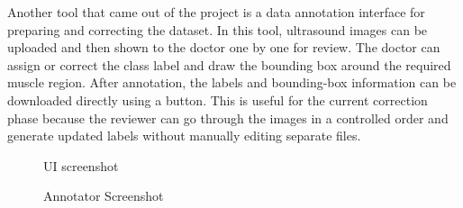 Another tool that came out of the project is a data annotation interface for preparing and correcting the dataset. In this tool, ultrasound images can be uploaded and then shown to the doctor one by one for review. The doctor can assign or correct the class label and draw the bounding box around the required muscle region. After annotation, the labels and bounding-box information can be downloaded directly using a button. This is useful for the current correction phase because the reviewer can go through the images in a controlled order and generate updated labels without manually editing separate files.

\begin{figure}[H]
    \centering
    \caption{UI screenshot}
    \label{fig:ui}
\end{figure}

\begin{figure}[H]
    \centering
    \caption{Annotator Screenshot}
    \label{fig:annotation_ui}
\end{figure}
